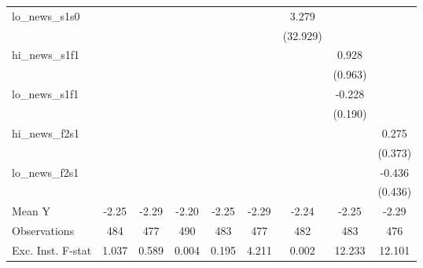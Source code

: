 {\begin{tabular}{l*{8}{c}}
\addlinespace
lo\_news\_s1s0&                     &                     &                     &                     &                     &       3.279         &                     &                     \\
            &                     &                     &                     &                     &                     &    (32.929)         &                     &                     \\
\addlinespace
hi\_news\_s1f1&                     &                     &                     &                     &                     &                     &       0.928         &                     \\
            &                     &                     &                     &                     &                     &                     &     (0.963)         &                     \\
\addlinespace
lo\_news\_s1f1&                     &                     &                     &                     &                     &                     &      -0.228         &                     \\
            &                     &                     &                     &                     &                     &                     &     (0.190)         &                     \\
\addlinespace
hi\_news\_f2s1&                     &                     &                     &                     &                     &                     &                     &       0.275         \\
            &                     &                     &                     &                     &                     &                     &                     &     (0.373)         \\
\addlinespace
lo\_news\_f2s1&                     &                     &                     &                     &                     &                     &                     &      -0.436         \\
            &                     &                     &                     &                     &                     &                     &                     &     (0.436)         \\
\midrule
Mean Y      &       -2.25         &       -2.29         &       -2.20         &       -2.25         &       -2.29         &       -2.24         &       -2.25         &       -2.29         \\
Observations&         484         &         477         &         490         &         483         &         477         &         482         &         483         &         476         \\
Exc. Inst. F-stat&       1.037         &       0.589         &       0.004         &       0.195         &       4.211         &       0.002         &      12.233         &      12.101         \\
\bottomrule
\end{tabular}
}
